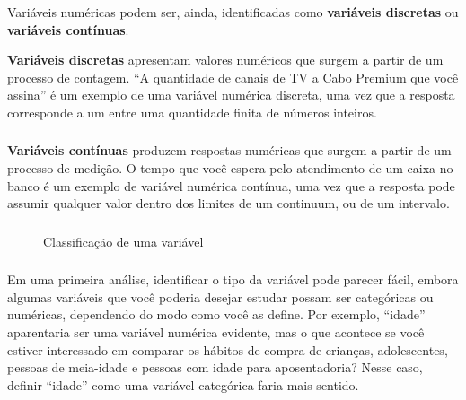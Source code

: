 \documentclass[12pt]{beamer}
\begin{document}
\begin{frame}{}
\frametitle{}
\begin{block}{}
\justifying
Variáveis numéricas podem ser, ainda, identificadas como \textbf{variáveis discretas} ou \textbf{variáveis contínuas}.
\end{block}
\pause
\begin{block}{}
\justifying
\textbf{Variáveis discretas} apresentam valores numéricos que surgem a partir de um processo de contagem. ``A quantidade de canais de TV a Cabo Premium que você 
assina'' é um exemplo de uma variável numérica discreta, uma vez que a resposta corresponde a um entre uma quantidade finita de números inteiros.
\end{block}
\end{frame}

\begin{frame}{}
\frametitle{}
\begin{block}{}
\justifying
\textbf{Variáveis contínuas} produzem respostas numéricas que surgem a partir de um processo de medição. O tempo que você espera pelo atendimento de um caixa no banco 
é um exemplo de variável numérica contínua, uma vez que a resposta pode assumir qualquer valor dentro dos limites de um continuum, ou de um intervalo.
\end{block}
\end{frame}

\begin{frame}{}
\frametitle{}
\begin{block}{}
\justifying
\begin{figure}[H]
    \centering
    \caption{Classificação de uma variável}
    \label{Fig2_ex}
  \end{figure}
\end{block}
\end{frame}

\begin{frame}{}
\frametitle{}
\begin{block}{}
\justifying
Em uma primeira análise, identificar o tipo da variável pode parecer fácil, embora algumas variáveis que você poderia desejar estudar possam ser categóricas ou numéricas, dependendo do modo como você as define. Por exemplo, ``idade'' aparentaria ser uma variável numérica evidente, mas o que acontece se você estiver interessado em comparar os hábitos de compra de crianças, adolescentes, pessoas de meia-idade e pessoas com idade para aposentadoria? Nesse caso, definir ``idade'' como uma variável categórica faria mais sentido. 
\end{block}
\end{frame}
\end{document}

